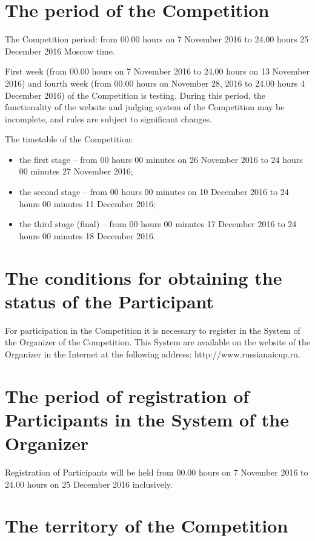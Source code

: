 \section{The period of the Competition}

The Competition period: from 00.00 hours on 7 November 2016 to 24.00 hours 25 December 2016 Moscow time.

First week (from 00.00 hours on 7 November 2016 to 24.00 hours on 13 November 2016)
and fourth week (from 00.00 hours on November 28, 2016 to 24.00 hours 4 December 2016) of the Competition is testing.
During this period, the functionality of the website and judging system of the Competition may be incomplete,
and rules are subject to significant changes.

The timetable of the Competition:
\begin{itemize}
\item the first stage – from 00 hours 00 minutes on 26 November 2016 to 24 hours 00 minutes 27 November 2016;
\item the second stage – from 00 hours 00 minutes on 10 December 2016 to 24 hours 00 minutes 11 December 2016;
\item the third stage (final) – from 00 hours 00 minutes 17 December 2016 to 24 hours 00 minutes 18 December 2016.
\end{itemize}

\section{The conditions for obtaining the status of the Participant}

For participation in the Competition it is necessary to register in the System of the Organizer of the Competition.
This System are available on the website of the Organizer in the Internet at the following address: http://www.russianaicup.ru.

\section{The period of registration of Participants in the System of the Organizer}

Registration of Participants will be held from 00.00 hours on 7 November 2016 to 24.00 hours on 25 December 2016 inclusively.

\section{The territory of the Competition}

